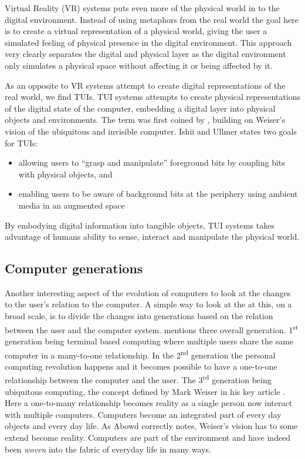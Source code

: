 Virtual Reality (VR) systems puts even more of the physical world in to the digital environment.
Instead of using metaphors from the real world the goal here is to create a virtual representation of a physical world, giving the user a simulated feeling of physical presence in the digital environment.
This approach very clearly separates the digital and physical layer as the digital environment only simulates a physical space without affecting it or being affected by it.

As an opposite to VR systems attempt to create digital representations of the real world, we find TUIs.
TUI systems attempts to create physical representations of the digital state of the computer, embedding a digital layer into physical objects and environments.
The term was first coined by \citet{ishii1997tangible}, building on Weiser's vision of the ubiquitous and invisible computer.
Ishii and Ullmer states two goals for TUIs:
\begin{itemize}
		\item{allowing users to ``grasp and manipulate'' foreground bits by coupling bits with physical objects, and}
		\item{enabling users to be aware of background bits at the periphery using ambient media in an augmented space}
\end{itemize}
By embodying digital information into tangible objects, TUI systems takes advantage of humans ability to sense, interact and manipulate the physical world. 


\subsection{Computer generations}
Another interesting aspect of the evolution of computers to look at the changes to the user's relation to the computer.
A simple way to look at the at this, on a broad scale, is to divide the changes into generations based on the relation between the user and the computer system.
\citet{abowd2012next} mentions three overall generation.
1\textsuperscript{st} generation being terminal based computing where multiple users share the same computer in a many-to-one relationship.
In the 2\textsuperscript{nd} generation the personal computing revolution happens and it becomes possible to have a one-to-one relationship between the computer and the user.
The 3\textsuperscript{rd} generation being ubiquitous computing, the concept defined by Mark Weiser in his key article \citep{weiser1991computer}.
Here a one-to-many relationship becomes reality as a single person now interact with multiple computers. Computers become an integrated part of every day objects and every day life. 
As Abowd correctly notes, Weiser's vision has to some extend become reality. 
Computers are part of the environment and have indeed been \textit{woven} into the fabric of everyday life in many ways.   

